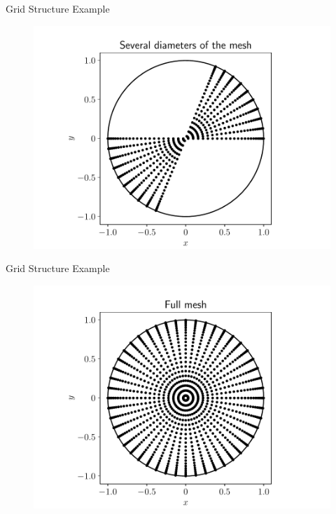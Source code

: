 \documentclass{beamer}
\begin{document}
\begin{frame}{Grid Structure Example}
    \begin{figure}[H]
        \centering
        \includegraphics[scale=0.55]{figures/several_diameters.pdf}
    \end{figure}
\end{frame}

\begin{frame}{Grid Structure Example}
    \begin{figure}[H]
        \centering
        \includegraphics[scale=0.55]{figures/full_mesh.pdf}
    \end{figure}
\end{frame}
\end{document}
